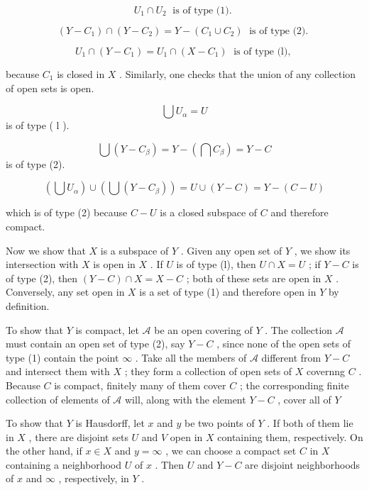 \documentclass[10pt]{article}
\begin{document}
\[
{U}_{1} \cap  {U}_{2}\;\text{ is of type (1). }
\]

\[
\left( {Y - {C}_{1}}\right)  \cap  \left( {Y - {C}_{2}}\right)  = Y - \left( {{C}_{1} \cup  {C}_{2}}\right) \;\text{ is of type (2). }
\]

\[
{U}_{1} \cap  \left( {Y - {C}_{1}}\right)  = {U}_{1} \cap  \left( {X - {C}_{1}}\right) \;\text{ is of type (l), }
\]

because \({C}_{1}\) is closed in \(X\) . Similarly, one checks that the union of any collection of open sets is open.

\[
\bigcup {U}_{\alpha } = U
\]
 is of type ( l ).

\[
\bigcup \left( {Y - {C}_{\beta }}\right)  = Y - \left( {\bigcap {C}_{\beta }}\right)  = Y - C
\]
 is of type (2).

\[
\left( {\bigcup {U}_{\alpha }}\right)  \cup  \left( {\bigcup \left( {Y - {C}_{\beta }}\right) }\right)  = U \cup  \left( {Y - C}\right)  = Y - \left( {C - U}\right)
\]

which is of type (2) because \(C - U\) is a closed subspace of \(C\) and therefore compact.

Now we show that \(X\) is a subspace of \(Y\) . Given any open set of \(Y\) , we show its intersection with \(X\) is open in \(X\) . If \(U\) is of type (l), then \(U \cap  X = U\) ; if \(Y - C\) is of type (2), then \(\left( {Y - C}\right)  \cap  X = X - C\) ; both of these sets are open in \(X\) . Conversely, any set open in \(X\) is a set of type (1) and therefore open in \(Y\) by definition.

To show that \(Y\) is compact, let \(\mathcal{A}\) be an open covering of \(Y\) . The collection \(\mathcal{A}\) must contain an open set of type (2), say \(Y - C\) , since none of the open sets of type (1) contain the point \(\infty\) . Take all the members of \(\mathcal{A}\) different from \(Y - C\) and intersect them with \(X\) ; they form a collection of open sets of \(X\) covernng \(C\) . Because \(C\) is compact, finitely many of them cover \(C\) ; the corresponding finite collection of elements of \(\mathcal{A}\) will, along with the element \(Y - C\) , cover all of \(Y\)

To show that \(Y\) is Hausdorff, let \(x\) and \(y\) be two points of \(Y\) . If both of them lie in \(X\) , there are disjoint sets \(U\) and \(V\) open in \(X\) containing them, respectively. On the other hand, if \(x \in  X\) and \(y = \infty\) , we can choose a compact set \(C\) in \(X\) containing a neighborhood \(U\) of \(x\) . Then \(U\) and \(Y - C\) are disjoint neighborhoods of \(x\) and \(\infty\) , respectively, in \(Y\) .
\end{document}
